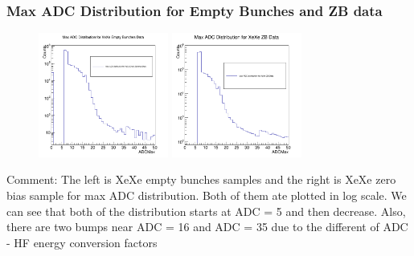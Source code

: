 \documentclass{beamer}
\begin{document}
\begin{frame}
\frametitle{Max ADC Distribution for Empty Bunches and ZB data}

\begin{figure}
\includegraphics[width=0.38\textwidth]{Plots/ADCMaxEMBXLog.png}
\includegraphics[width=0.38\textwidth]{Plots/ADCMaxZBLog.png}
\end{figure}

\begin{block}
{Comment: The left is XeXe empty bunches samples and the right is XeXe zero bias sample for max ADC distribution. Both of them ate plotted in log scale. We can see that both of the distribution starts at ADC = 5 and then decrease. Also, there are two bumps near ADC = 16 and ADC = 35 due to the different of ADC - HF energy conversion factors}
\end{block}
\end{frame}

\end{document}
